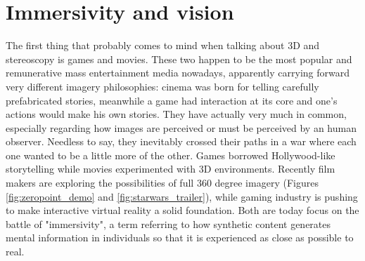 \section{Immersivity and vision}
The first thing that probably comes to mind when talking about 3D and stereoscopy is games and movies. These two happen to be the most popular and remunerative mass entertainment media nowadays, apparently carrying forward very different imagery philosophies: cinema was born for telling carefully prefabricated stories, meanwhile a game had interaction at its core and one’s actions would make his own stories. They have actually very much in common, especially regarding how images are perceived or must be perceived by an human observer. Needless to say, they inevitably crossed their paths in a war where each one wanted to be a little more of the other. Games borrowed Hollywood-like storytelling while movies experimented with 3D environments. Recently film makers are exploring the possibilities of full 360 degree imagery (Figures \ref{fig:zeropoint_demo} and \ref{fig:starwars_trailer}), while gaming industry is pushing to make interactive virtual reality a solid foundation. Both are today focus on the battle of "immersivity", a term referring to how synthetic content generates mental information in individuals so that it is experienced as close as possible to real.\\
